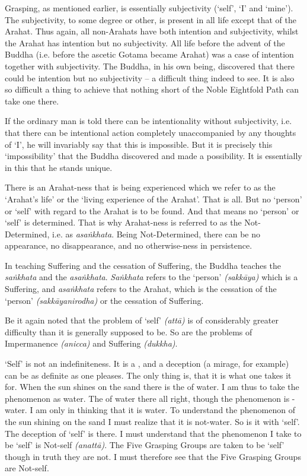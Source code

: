 Grasping, as mentioned earlier, is essentially subjectivity (`self', `I' and `mine'). The subjectivity, to some degree or other, is present in all life except that of the Arahat. Thus again, all non-Arahats have both intention and subjectivity, whilst the Arahat has intention but no subjectivity. All life before the advent of the Buddha (i.e. before the ascetic Gotama became Arahat) was a case of intention together with subjectivity. The Buddha, in his own being, discovered that there could be intention but no subjectivity -- a difficult thing indeed to see. It is also so difficult a thing to achieve that nothing short of the Noble Eightfold Path can take one there.

If the ordinary man is told there can be intentionality without subjectivity, i.e. that there can be intentional action completely unaccompanied by any thoughts of `I', he will invariably say that this is impossible. But it is precisely this `impossibility' that the Buddha discovered and made a possibility. It is essentially in this that he stands unique.

There is an Arahat-ness that is being experienced which we refer to as the `Arahat's life' or the `living experience of the Arahat'. That is all. But no `person' or `self' with regard to the Arahat is to be found. And that means no `person' or `self' is determined. That is why Arahat-ness is referred to as the Not-Determined, i.e. as \emph{asaṅkhata}. Being Not-Determined, there can be no appearance, no disappearance, and no otherwise-ness in persistence.

In teaching Suffering and the cessation of Suffering, the Buddha teaches the \emph{saṅkhata} and the \emph{asaṅkhata}. \emph{Saṅkhata} refers to the `person' \emph{(sakkāya)} which is a Suffering, and \emph{asaṅkhata} refers to the Arahat, which is the cessation of the `person' \emph{(sakkāyanirodha)} or the cessation of Suffering.

\sectionBreak

Be it again noted that the problem of `self' \emph{(attā)} is of considerably greater difficulty than it is generally supposed to be. So are the problems of Impermanence \emph{(anicca)} and Suffering \emph{(dukkha)}.

`Self' is not an indefiniteness. It is a , and a deception (a mirage, for example) can be as definite as one pleases. The only thing is, that it is  what one takes it for. When the sun shines on the sand there is the  of water. I am thus  to take the phenomenon as water. The  of water  there all right, though the phenomenon is -water. I am only  in thinking that it is water. To understand the phenomenon of the sun shining on the sand I must realize that it is not-water. So is it with `self'. The deception of `self' is there. I must understand that the phenomenon I take to be `self' is Not-self \emph{(anattā)}. The Five Grasping Groups are taken to be `self' though in truth they are not. I must therefore see that the Five Grasping Groups are Not-self.

